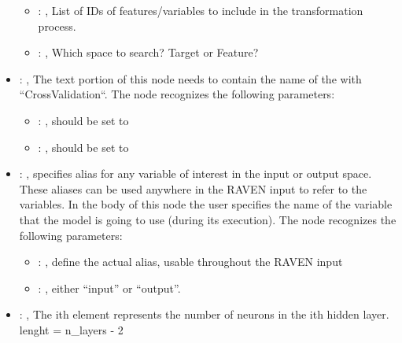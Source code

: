 \begin{itemize}
\begin{itemize}
        \item {}: , 
          List of IDs of features/variables to include in the transformation process.

        \item {}: , 
          Which space to search? Target or Feature?
      \end{itemize}

    \item {}: , 
      The text portion of this node needs to contain the name of the  with
               ``CrossValidation``.
      The  node recognizes the following parameters:
        \begin{itemize}
          \item {}: , 
            should be set to 
          \item {}: , 
            should be set to 
      \end{itemize}

    \item {}: , 
      specifies alias for         any variable of interest in the input or output space. These
      aliases can be used anywhere in the RAVEN input to         refer to the variables. In the body
      of this node the user specifies the name of the variable that the model is going to use
      (during its execution).
      The  node recognizes the following parameters:
        \begin{itemize}
          \item {}: , 
            define the actual alias, usable throughout the RAVEN input
          \item {}: , 
            either ``input'' or ``output''.
      \end{itemize}

    \item {}: , 
      The ith element represents the number of neurons in the ith hidden layer.
      lenght = n\_layers - 2


\end{itemize}
